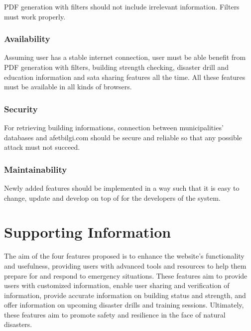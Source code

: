 \documentclass[12pt]{report}
\begin{document}
PDF generation with filters should not include irrelevant information. Filters must work properly.

\subsubsection{Availability}
Assuming user has a stable internet connection, user must be able benefit from PDF generation with filters, building strength checking, disaster drill and education information and sata sharing features all the time.
All these features must be available in all kinds of browsers.

\subsubsection{Security}
For retrieving building informations, connection between municipalities' databases and afetbilgi.com should be secure and reliable so that any possible attack must not succeed.

\subsubsection{Maintainability}
Newly added features should be implemented in a way such that it is easy to change, update and develop on top of for the developers of the system.

\section{Supporting Information}
The aim of the four features proposed is to enhance the website's functionality and usefulness, providing users with advanced tools and 
resources to help them prepare for and respond to emergency situations. These features aim to provide users with customized information, 
enable user sharing and verification of information, provide accurate information on building status and strength, and offer information on 
upcoming disaster drills and training sessions. Ultimately, these features aim to promote safety and resilience in the face of natural disasters.
\end{document}

